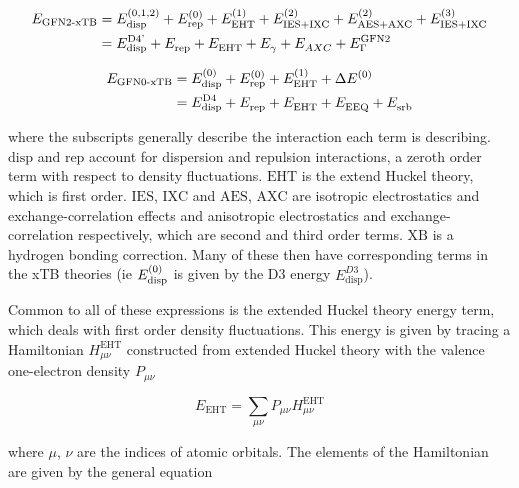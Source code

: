 \begin{equation}
\begin{aligned}
E_{\text{GFN2-xTB}} &= E^{\left(0,1,2\right)}_{\text{disp}} + E^{\left(0\right)}_{\text{rep}} + E^{\left(1\right)}_{\text{EHT}}  + E^{\left(2\right)}_{\text{IES+IXC}} + E^{\left(2\right)}_{\text{AES+AXC}} + E^{\left(3\right)}_{\text{IES+IXC}} \\
&= E^{\text{D4'}}_{\text{disp}} + E^{}_{\text{rep}} + E^{}_{\text{EHT}}  + E^{}_{\gamma} + E^{}_{AXC} + E^{\text{GFN2}}_{\Gamma}
\end{aligned}
\end{equation}

\begin{equation}
\begin{aligned}
E_{\text{GFN0-xTB}} &= E^{\left(0\right)}_{\text{disp}} + E^{\left(0\right)}_{\text{rep}} + E^{\left(1\right)}_{\text{EHT}}  + \Delta E^{\left(0\right)}_{} \\
&= E^{\text{D4}}_{\text{disp}} + E^{}_{\text{rep}} + E^{}_{\text{EHT}}  + E^{}_{\text{EEQ}} + E^{}_{\text{srb}}
\end{aligned}
\end{equation}

where the subscripts generally describe the interaction each term is describing. 
$\text{disp}$ and $\text{rep}$ account for dispersion and repulsion interactions, 
a zeroth order term with respect to density fluctuations. $\text{EHT}$ is the extend 
Huckel theory, which is first order. $\text{IES}$, $\text{IXC}$ and $\text{AES}$, 
$\text{AXC}$ are isotropic electrostatics and exchange-correlation effects and anisotropic 
electrostatics and exchange-correlation respectively, which are second and third 
order terms. $\text{XB}$ is a hydrogen bonding correction. Many of these then have 
corresponding terms in the xTB theories (ie $E^{\left(0\right)}_{\text{disp}}$ is given by 
the D3 energy $E^{D3}_{\text{disp}}$). 

Common to all of these expressions is the extended Huckel theory energy term, which 
deals with first order density fluctuations. This energy is given by tracing a Hamiltonian 
$H_{\mu\nu}^{\text{EHT}}$ constructed from extended Huckel theory with the valence 
one-electron density $P_{\mu\nu}$

\begin{equation}
E_{\text{EHT}} = \sum_{\mu\nu} P_{\mu\nu} H_{\mu\nu}^{\text{EHT}}
\end{equation}

where $\mu$, $\nu$ are the indices of atomic orbitals. The elements of the Hamiltonian 
are given by the general equation


